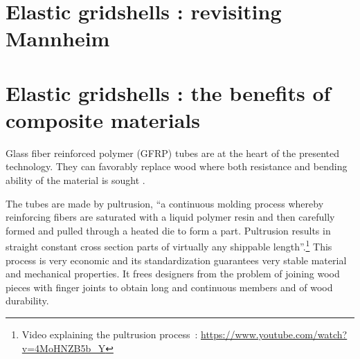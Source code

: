 %


\section{Elastic gridshells : revisiting Mannheim}


\section{Elastic gridshells : the benefits of composite materials}

Glass fiber reinforced polymer (GFRP) tubes are at the heart of the presented technology. They can favorably replace wood where both resistance and bending ability of the material is sought \cite{Douthe2010}. 

The tubes are made by pultrusion, \enquote{a continuous molding process whereby reinforcing fibers are saturated with a liquid polymer resin and then carefully formed and pulled through a heated die to form a part. Pultrusion results in straight constant cross section parts of virtually any shippable length}.\footnote{Video explaining the pultrusion process~: \url{https://www.youtube.com/watch?v=4MoHNZB5b_Y}} This process is very economic and its standardization guarantees very stable material and mechanical properties. It frees designers from the problem of joining wood pieces with finger joints to obtain long and continuous members and of wood durability.

